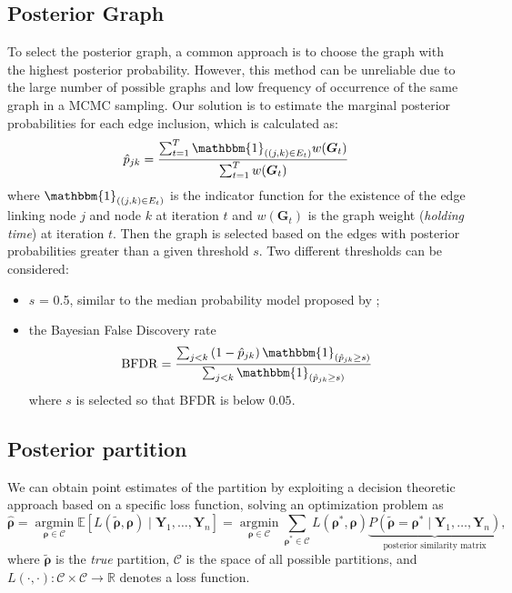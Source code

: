 \subsection{Posterior Graph}

To select the posterior graph, a common approach is to choose the graph with the highest posterior probability. However, this method can be unreliable due to the large number of possible graphs and low frequency of occurrence of the same graph in a MCMC sampling. Our solution is to estimate the marginal posterior probabilities for each edge inclusion, which is calculated as:
\[
    \hat{p}_{j k}=\frac{\sum_{t=1}^T \mathbbm{1}_{((j, k) \in E_t)} w(\boldsymbol{G}_t)}{\sum_{t=1}^T w(\boldsymbol{G}_t)}
\]
where $\mathbbm{1}_{\left((j, k) \in E_t\right)}$ is the indicator function for the existence of the edge linking node $j$ and node $k$ at iteration $t$ and $w(\boldsymbol{G}_t)$ is the graph weight (\emph{holding time}) at iteration $t$.
Then the graph is selected based on the edges with posterior probabilities greater than a given threshold $s$. 
Two different thresholds can be considered:
\begin{itemize}
    \item $s$ = 0.5, similar to the median probability model proposed by \textcite{Barbieri2004Optimal};
    \item the Bayesian False Discovery rate \parencite[BFDR;][]{Mller2006FDRAB}
    \[
        \operatorname{BFDR}=\frac{\sum_{j<k}\left(1-\hat{p}_{j k}\right) \mathbbm{1}_{\left(\hat{p}_{j k} \geq s\right)}}{\sum_{j<k} \mathbbm{1}_{\left(\hat{p}_{j k} \geq s\right)}}
    \]
where $s$ is selected so that BFDR is below $0.05$.

\end{itemize}

\subsection{Posterior partition}

We can obtain point estimates of the partition by exploiting a decision theoretic approach based on a specific loss function, solving an optimization problem as
\[
    \hat{\bm{\rho}}=\underset{\bm{\rho} \in \mathcal{C}}{\operatorname{argmin}} \mathbb{E}\left[L\left(\tilde{\bm{\rho}}, \bm{\rho}\right) \mid \bm{Y}_1, \ldots, \bm{Y}_n \right]=\underset{\bm{\rho} \in \mathcal{C}}{\operatorname{argmin}} \sum_{\bm{\rho}^* \in \mathcal{C}} L\left(\bm{\rho}^*, \bm{\rho}\right) \underbrace{P\left(\tilde{\bm{\rho}}=\bm{\rho}^* \mid \bm{Y}_1, \ldots, \bm{Y}_n\right)}_{\text{posterior similarity matrix}},
\]
where $\tilde{\bm{\rho}}$ is the \emph{true} partition, $\mathcal{C}$ is the space of all possible partitions, and $L(\cdot, \cdot): \mathcal{C} \times \mathcal{C} \rightarrow \mathbb{R}$ denotes a loss function.

